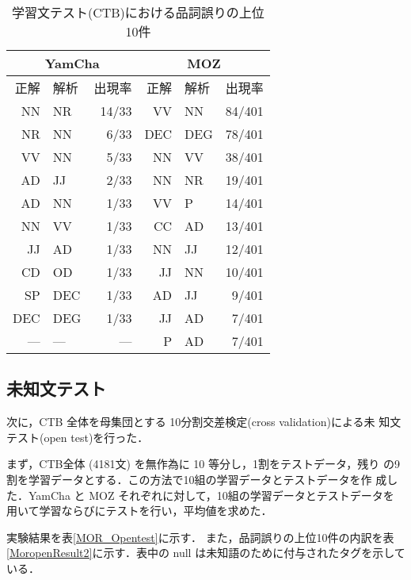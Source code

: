 \begin{table}[htb]
  \begin{center}
   \caption{学習文テスト(CTB)における品詞誤りの上位10件}
   \begin{tabular}{r@{ - }l|r|r@{ - }l|r}  \hline
\multicolumn{3}{c|}{YamCha}    & \multicolumn{3}{c}{MOZ} \\ 
\hline
    正解 & 解析 & 出現率 & 正解 & 解析& 出現率\\ 
\hline
    NN   & NR   & 14/33  & VV & NN &84/401 \\ 
    NR   & NN   & 6/33   & DEC& DEG&78/401 \\ 
    VV   & NN   & 5/33   & NN & VV &38/401 \\ 
    AD   & JJ   & 2/33   & NN & NR &19/401 \\ 
    AD   & NN   & 1/33   & VV & P  &14/401 \\ 
    NN   & VV   & 1/33   & CC & AD &13/401 \\ 
    JJ   & AD   & 1/33   & NN & JJ &12/401 \\ 
    CD   & OD   & 1/33   & JJ & NN &10/401 \\ 
    SP   & DEC  & 1/33   & AD & JJ &9/401 \\ 
    DEC  & DEG  & 1/33   & JJ & AD &7/401 \\ 
    ---& ---&  ---       & P  & AD &7/401 \\ 
\hline
   \end{tabular}
   \label{MorclosedResult2}
  \end{center}
\end{table}



\subsection{未知文テスト}
次に，CTB 全体を母集団とする 10分割交差検定(cross validation)による未
知文テスト(open test)を行った．

まず，CTB全体 (4181文) を無作為に 10 等分し，1割をテストデータ，残り
の9割を学習データとする．この方法で10組の学習データとテストデータを作
成した．YamCha と MOZ それぞれに対して，10組の学習データとテストデータを
用いて学習ならびにテストを行い，平均値を求めた．

実験結果を表\ref{MOR_Opentest}に示す．
また，品詞誤りの上位10件の内訳を表\ref{MoropenResult2}に示す．表中の
null は未知語のために付与されたタグを示している．

